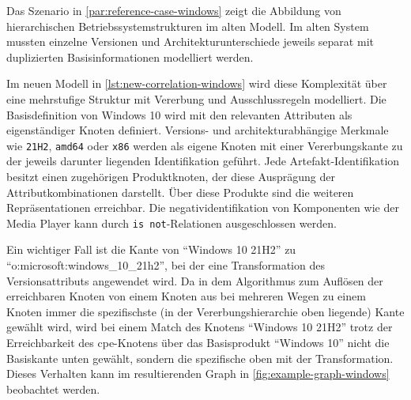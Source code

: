 Das Szenario in \autoref{par:reference-case-windows} zeigt die Abbildung von hierarchischen Betriebssystemstrukturen im alten Modell.
Im alten System mussten einzelne Versionen und Architekturunterschiede jeweils separat mit duplizierten Basisinformationen modelliert werden.

Im neuen Modell in \autoref{lst:new-correlation-windows} wird diese Komplexität über eine mehrstufige Struktur mit Vererbung und Ausschlussregeln modelliert.
Die Basisdefinition von Windows 10 wird mit den relevanten Attributen als eigenständiger Knoten definiert.
Versions- und architekturabhängige Merkmale wie \texttt{21H2}, \texttt{amd64} oder \texttt{x86} werden als eigene Knoten mit einer Vererbungskante zu der jeweils darunter liegenden Identifikation geführt.
Jede Artefakt-Identifikation besitzt einen zugehörigen Produktknoten, der diese Ausprägung der Attributkombinationen darstellt.
Über diese Produkte sind die weiteren Repräsentationen erreichbar.
Die negatividentifikation von Komponenten wie der Media Player kann durch \texttt{is not}-Relationen ausgeschlossen werden.

Ein wichtiger Fall ist die Kante von \enquote{Windows 10 21H2} zu \enquote{o:microsoft:windows\_10\_21h2}, bei der eine Transformation des Versionsattributs angewendet wird.
Da in dem Algorithmus zum Auflösen der erreichbaren Knoten von einem Knoten aus bei mehreren Wegen zu einem Knoten immer die spezifischste (in der Vererbungshierarchie oben liegende) Kante gewählt wird, wird bei einem Match des Knotens \enquote{Windows 10 21H2} trotz der Erreichbarkeit des \acrshort{cpe}-Knotens über das Basisprodukt \enquote{Windows 10} nicht die Basiskante unten gewählt, sondern die spezifische oben mit der Transformation.
Dieses Verhalten kann im resultierenden Graph in \autoref{fig:example-graph-windows} beobachtet werden.

